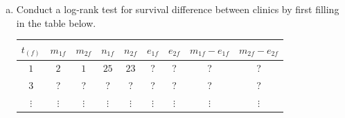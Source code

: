 \documentclass[12pt]{article}
\begin{document}
\begin{enumerate}[(a)]
\item Conduct a log-rank test for survival difference between clinics by first filling in the table below.

	\begin{center}
\begin{tabular}{ c | c c | c c | c c | c c }

 $t_{(f)}$ & $m_{1f}$ & $m_{2f}$ & $n_{1f}$ & $n_{2f}$   & $e_{1f}$ & $e_{2f}$ & $m_{1f} - e_{1f}$ & $m_{2f} - e_{2f}$ \\

 \hline

 $1$ & $2$ & $1$ & $25$ & $23$    & ? & ? & ? & ? \\

 $3$ & ? & ? & ? & ?    & ? & ? & ? & ? \\

 $\vdots$ & $\vdots$ & $\vdots$ & $\vdots$ & $\vdots$    & $\vdots$ & $\vdots$ & $\vdots$ & $\vdots$ \\

 \hline


\end{tabular}
\end{center}
\end{enumerate}
\end{document}
